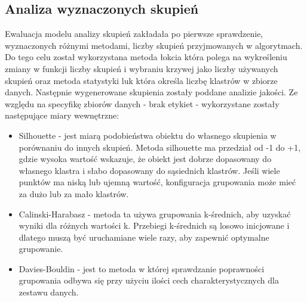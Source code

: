 \documentclass[a4paper,11pt]{article}
\begin{document}
\subsection{Analiza wyznaczonych skupień}
Ewaluacja modelu analizy skupień zakładała po pierwsze sprawdzenie, wyznaczonych różnymi metodami, liczby skupień przyjmowanych w algorytmach. Do tego celu został wykorzystana metoda łokcia która polega na wykreśleniu zmiany w funkcji liczby skupień i wybraniu krzywej jako liczby używanych skupień oraz metoda statystyki luk która określa liczbę klastrów w zbiorze danych. Następnie wygenerowane skupienia zostały poddane analizie jakości. Ze względu na specyfikę zbiorów danych - brak etykiet - wykorzystane zostały następujące miary wewnętrzne:

\begin{itemize}
    \item Silhouette - jest miarą podobieństwa obiektu do własnego skupienia w porównaniu do innych skupień. Metoda silhouette ma przedział od -1 do +1, gdzie wysoka wartość wskazuje, że obiekt jest dobrze dopasowany do własnego klastra i słabo dopasowany do sąsiednich klastrów. Jeśli wiele punktów ma niską lub ujemną wartość, konfiguracja grupowania może mieć za dużo lub za mało klastrów.

    \item Calinski-Harabasz - metoda ta używa grupowania k-średnich, aby uzyskać wyniki  dla różnych wartości k. Przebiegi k-średnich są losowo inicjowane i dlatego muszą być uruchamiane wiele razy, aby zapewnić optymalne grupowanie.
    \item Davies-Bouldin - jest to metoda w której sprawdzanie poprawności grupowania odbywa się przy użyciu ilości cech charakterystycznych dla zestawu danych.
\end{itemize}
\end{document}
